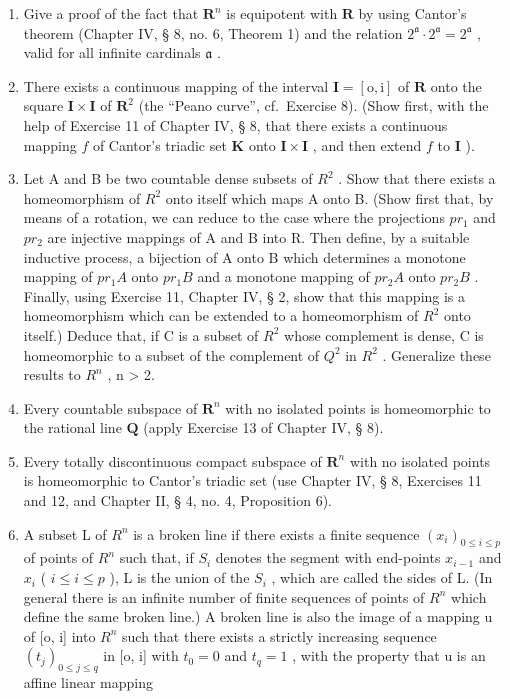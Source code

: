 \ExerciseSection

\begin{enumerate}
\def\labelenumi{\arabic{enumi})}
\item
  Give a proof of the fact that \(\mathbf{R}^n\) is equipotent with \(\mathbf{R}\) by using Cantor's theorem (Chapter IV, § 8, no. 6, Theorem 1) and the relation \(2^{\mathfrak{a}} \cdot 2^{\mathfrak{a}} = 2^{\mathfrak{a}}\) , valid for all infinite cardinals \(\mathfrak{a}\) .
\item
  There exists a continuous mapping of the interval \(\mathbf{I} = [\mathrm{o},\mathrm{i}]\) of \(\mathbf{R}\) onto the square \(\mathbf{I}\times \mathbf{I}\) of \(\mathbf{R}^2\) (the ``Peano curve'', cf.~Exercise 8). (Show first, with the help of Exercise 11 of Chapter IV, § 8, that there exists a continuous mapping \(f\) of Cantor's triadic set \(\mathbf{K}\) onto \(\mathbf{I}\times \mathbf{I}\) , and then extend \(f\) to \(\mathbf{I}\) ).
\item
  Let A and B be two countable dense subsets of \(R^{2}\) . Show that there exists a homeomorphism of \(R^{2}\) onto itself which maps A onto B. (Show first that, by means of a rotation, we can reduce to the case where the projections \(pr_{1}\) and \(pr_{2}\) are injective mappings of A and B into R. Then define, by a suitable inductive process, a bijection of A onto B which determines a monotone mapping of \(pr_{1}A\) onto \(pr_{1}B\) and a monotone mapping of \(pr_{2}A\) onto \(pr_{2}B\) . Finally, using Exercise 11, Chapter IV, § 2, show that this mapping is a homeomorphism which can be extended to a homeomorphism of \(R^{2}\) onto itself.) Deduce that, if C is a subset of \(R^{2}\) whose complement is dense, C is homeomorphic to a subset of the complement of \(Q^{2}\) in \(R^{2}\) . Generalize these results to \(R^{n}\) , n \textgreater{} 2.
\item
  Every countable subspace of \(\mathbf{R}^n\) with no isolated points is homeomorphic to the rational line \(\mathbf{Q}\) (apply Exercise 13 of Chapter IV, § 8).
\item
  Every totally discontinuous compact subspace of \(\mathbf{R}^n\) with no isolated points is homeomorphic to Cantor's triadic set (use Chapter IV, § 8, Exercises 11 and 12, and Chapter II, § 4, no. 4, Proposition 6).
\item
  A subset L of \(R^{n}\) is a broken line if there exists a finite sequence \((x_{i})_{0\leqslant i\leqslant p}\) of points of \(R^{n}\) such that, if \(S_{i}\) denotes the segment with end-points \(x_{i-1}\) and \(x_{i}\) ( \(i\leqslant i\leqslant p\) ), L is the union of the \(S_{i}\) , which are called the sides of L. (In general there is an infinite number of finite sequences of points of \(R^{n}\) which define the same broken line.) A broken line is also the image of a mapping u of {[}o, i{]} into \(R^{n}\) such that there exists a strictly increasing sequence \((t_{j})_{0\leqslant j\leqslant q}\) in {[}o, i{]} with \(t_{0}=0\) and \(t_{q}=1\) , with the property that u is an affine linear mapping
\end{enumerate}

